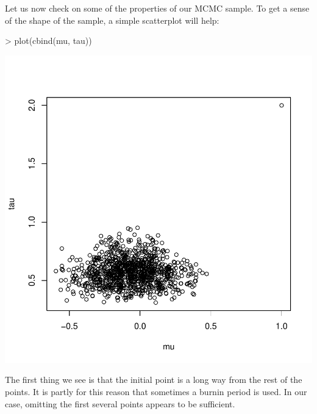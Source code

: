 \documentclass{article}
\begin{document}
Let us now check on some of the properties of our MCMC sample.  To get a sense of the 
shape of the sample, a simple scatterplot will help:
\begin{Schunk}
\begin{Sinput}
> plot(cbind(mu, tau))
\end{Sinput}
\end{Schunk}
\includegraphics{MCMCexample-004}

The first thing we see is that the initial point is a long way from the rest of the points.  It 
is partly for this reason that sometimes a burnin period is used.  In our case, omitting the first
several points appears to be sufficient.  
\end{document}
